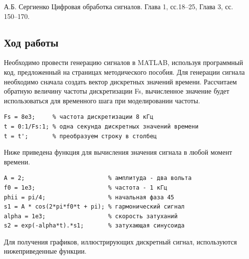 \documentclass[12pt,a4paper]{article}
\begin{document}
А.Б. Сергиенко Цифровая обработка сигналов. Глава 1,
сс.18–25, Глава 3, сс. 150–170.

\subsection{Ход работы}

Необходимо провести генерацию сигналов в MATLAB, используя программный код, предложенный на страницах методического пособия.
Для генерации сигнала необходимо сначала создать вектор дискретных значений времени.
Рассчитаем обратную величину частоты дискретизации Fs, вычисленное значение будет использоваться для временного шага при моделировании частоты.

\begin{verbatim}
Fs = 8e3;     % частота дискретизации 8 кГц
t = 0:1/Fs:1; % одна секунда дискретных значений времени
t = t';       % преобразуем строку в столбец
\end{verbatim}

Ниже приведена функция для вычисления значения сигнала в любой момент времени.

\begin{verbatim}
A = 2;                        % амплитуда - два вольта
f0 = 1e3;                     % частота - 1 кГц
phii = pi/4;                  % начальная фаза 45
s1 = A * cos(2*pi*f0*t + pi); % гармонический сигнал
alpha = 1e3;                  % скорость затуханий
s2 = exp(-alpha*t).*s1;       % затухающая синусоида
\end{verbatim}

Для получения графиков, иллюстрирующих дискретный сигнал, используются нижеприведенные функции.
\end{document}

